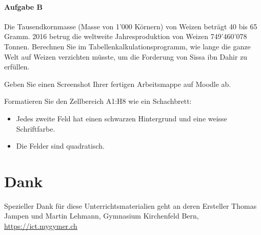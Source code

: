 \begin{mysubmission}[Weizenkornlegende]
    \paragraph*{Aufgabe B}
    Die Tausendkornmasse (Masse von 1’000 Körnern) von Weizen beträgt 40 bis 65 Gramm. 2016 betrug die weltweite Jahresproduktion von Weizen 749'460'078 Tonnen. Berechnen Sie im Tabellenkalkulationsprogramm, wie lange die ganze Welt auf Weizen verzichten müsste, um die Forderung von Sissa ibn Dahir zu erfüllen.

    Geben Sie einen Screenshot Ihrer fertigen Arbeitsmappe auf Moodle ab.
\end{mysubmission}
\begin{mychallenge}
    Formatieren Sie den Zellbereich A1:H8 wie ein Schachbrett:
    \begin{itemize}
        \item Jedes zweite Feld hat einen schwarzen Hintergrund und eine weisse Schriftfarbe.
        \item Die Felder sind quadratisch.
    \end{itemize}
\end{mychallenge}





\section*{Dank}
Spezieller Dank für diese Unterrichtsmaterialien geht an deren Ersteller Thomas Jampen und Martin Lehmann, Gymnasium Kirchenfeld Bern, \url{https://ict.mygymer.ch}

